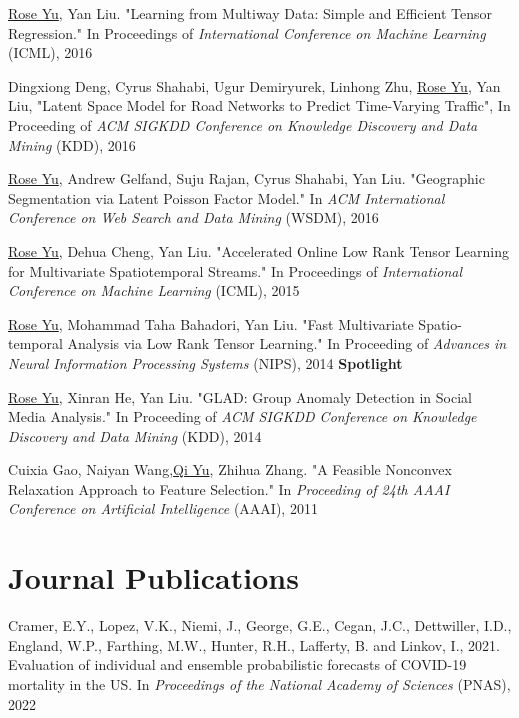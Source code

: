 \documentclass[margin,line]{res}
\begin{document}
\begin{resume}
\begin{enumerate}[label={[C\arabic*]}]
\item \underline{Rose Yu}, Yan Liu. "Learning from Multiway Data: Simple and Efficient Tensor Regression." In Proceedings  of  \textit{International Conference on Machine Learning }(ICML),   2016

\item Dingxiong Deng, Cyrus Shahabi, Ugur Demiryurek, Linhong Zhu,  \underline{Rose Yu}, Yan Liu, 
"Latent Space Model for Road Networks to Predict Time-Varying Traffic", In Proceeding of  \textit{ACM SIGKDD Conference on Knowledge Discovery and Data Mining } (KDD), 2016


\item \underline{Rose Yu}, Andrew Gelfand, Suju Rajan, Cyrus Shahabi, Yan Liu. "Geographic Segmentation via Latent Poisson Factor Model." In \textit{ACM International Conference on Web Search and Data Mining} (WSDM), 2016 

\item \underline{Rose Yu}, Dehua Cheng, Yan Liu. "Accelerated Online Low Rank Tensor Learning for Multivariate Spatiotemporal Streams." In Proceedings  of  \textit{International Conference on Machine Learning} (ICML), 2015

\item \underline{Rose Yu}, Mohammad Taha Bahadori, Yan Liu. "Fast Multivariate Spatio-temporal Analysis via Low Rank Tensor Learning." In Proceeding of  \textit{Advances in Neural Information Processing Systems} (NIPS), 2014 \textbf{Spotlight}

\item \underline{Rose Yu}, Xinran He, Yan Liu. "GLAD: Group Anomaly Detection in Social Media Analysis." In Proceeding of  \textit{ACM SIGKDD Conference on Knowledge Discovery and Data Mining} (KDD), 2014

\item Cuixia Gao, Naiyan Wang,\underline{Qi Yu}, Zhihua Zhang. "A Feasible Nonconvex Relaxation Approach to Feature Selection." In \textit{Proceeding of 24th AAAI Conference on Artificial Intelligence} (AAAI), 2011 

\end{enumerate}

 
\section{\sc Journal Publications}
\begin{enumerate}[label={[J\arabic*]}]
\item Cramer, E.Y., Lopez, V.K., Niemi, J., George, G.E., Cegan, J.C., Dettwiller, I.D., England, W.P., Farthing, M.W., Hunter, R.H., Lafferty, B. and Linkov, I., 2021. Evaluation of individual and ensemble probabilistic forecasts of COVID-19 mortality in the US. In \textit{Proceedings of the National Academy of Sciences} (PNAS), 2022



\end{enumerate}
\end{resume}
\end{document}

